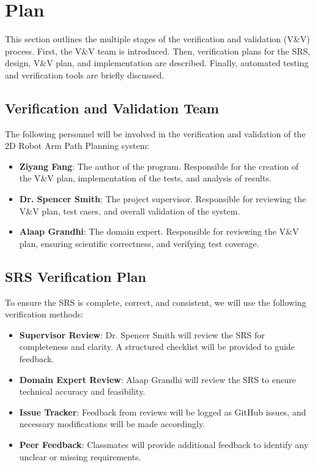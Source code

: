\documentclass[12pt, titlepage]{article}
\begin{document}
\citet{SRS}


\section{Plan}

This section outlines the multiple stages of the verification and validation (V\&V) process. First, the V\&V team is introduced. Then, verification plans for the SRS, design, V\&V plan, and implementation are described. Finally, automated testing and verification tools are briefly discussed.

\subsection{Verification and Validation Team}

The following personnel will be involved in the verification and validation of the 2D Robot Arm Path Planning system:

\begin{itemize}
    \item \textbf{Ziyang Fang}: The author of the program. Responsible for the creation of the V\&V plan, implementation of the tests, and analysis of results.
    \item \textbf{Dr. Spencer Smith}: The project supervisor. Responsible for reviewing the V\&V plan, test cases, and overall validation of the system.
    \item \textbf{Alaap Grandhi}: The domain expert. Responsible for reviewing the V\&V plan, ensuring scientific correctness, and verifying test coverage.
\end{itemize}

\subsection{SRS Verification Plan}

To ensure the SRS is complete, correct, and consistent, we will use the following verification methods:

\begin{itemize}
    \item \textbf{Supervisor Review}: Dr. Spencer Smith will review the SRS for completeness and clarity. A structured checklist will be provided to guide feedback.
    \item \textbf{Domain Expert Review}: Alaap Grandhi will review the SRS to ensure technical accuracy and feasibility.
    \item \textbf{Issue Tracker}: Feedback from reviews will be logged as GitHub issues, and necessary modifications will be made accordingly.
    \item \textbf{Peer Feedback}: Classmates will provide additional feedback to identify any unclear or missing requirements.
\end{itemize}
\end{document}
